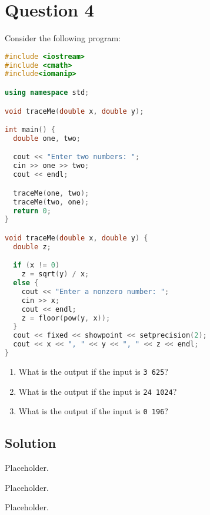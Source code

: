 \documentclass[a4paper, 11pt]{article}
\begin{document}
  \newpage
  \section{Question 4}
    Consider the following program:

    \begin{lstlisting}[language=c++,caption={Question 4 Problem}]
#include <iostream>
#include <cmath>
#include<iomanip>

using namespace std;

void traceMe(double x, double y);

int main() {
  double one, two;

  cout << "Enter two numbers: ";
  cin >> one >> two;
  cout << endl;

  traceMe(one, two);
  traceMe(two, one);
  return 0;
}

void traceMe(double x, double y) {
  double z;

  if (x != 0)
    z = sqrt(y) / x;
  else {
    cout << "Enter a nonzero number: ";
    cin >> x;
    cout << endl;
    z = floor(pow(y, x));
  }
  cout << fixed << showpoint << setprecision(2);
  cout << x << ", " << y << ", " << z << endl;
}
    \end{lstlisting}

    \begin{enumerate}[label=\Alph*.]
      \item What is the output if the input is \texttt{3 625}?
      \item What is the output if the input is \texttt{24 1024}?
      \item What is the output if the input is \texttt{0 196}?
    \end{enumerate}

    \subsection{Solution}
    \begin{enumerate}[label=\alph*.]
      \begin{minipage}{0.45\textwidth}
        \item \begin{mdframed}[style=AnswerFrame]
          Placeholder.
          \end{mdframed}
        \item \begin{mdframed}[style=AnswerFrame]
          Placeholder.
          \end{mdframed}
      \end{minipage}\hfill
      \begin{minipage}{.45\textwidth}
        \item \begin{mdframed}[style=AnswerFrame]
          Placeholder.
          \end{mdframed}
      \end{minipage}
    \end{enumerate}
\end{document}
